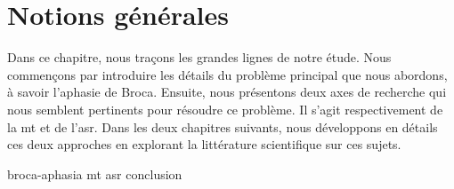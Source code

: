 \chapter{Notions générales}%
\label{chap.general-notions}

Dans ce chapitre, nous traçons les grandes lignes de notre étude.
Nous commençons par introduire les détails du problème principal que nous abordons, à savoir l'aphasie de Broca.
Ensuite, nous présentons deux axes de recherche qui nous semblent pertinents pour résoudre ce problème.
Il s'agit respectivement de la \gls{mt} et de l'\gls{asr}.
Dans les deux chapitres suivants, 
nous développons en détails ces deux approches
en explorant la littérature scientifique sur ces sujets.

{broca-aphasia}
{mt}
{asr}
{conclusion}